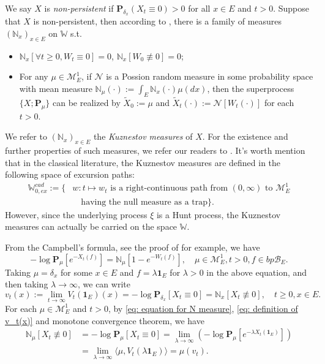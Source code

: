\documentclass[12pt, a4paper]{amsart}
\theoremstyle{definition}
\numberwithin{equation}{section}
\begin{document}
	We say $X$ is \emph{non-persistent} if $\mathbf P_{\delta_x}(X_t \equiv 0) > 0$ for all $x\in E$ and $t> 0$.
	Suppose that $X$ is non-persistent, then according to \cite[Section 8]{Li2011Measure-valued}, there is a family of measures $(\mathbb N_x)_{x\in E}$ on $\mathbb W$ s.t. 
\begin{itemize}
	\item 
	$\mathbb N_x [ \forall t \geq 0, W_t \equiv 0] =0$, $\mathbb N_x[W_0 \not\equiv 0] = 0$;
	\item
	For any $\mu \in \mathcal M_E^1$, if $\mathcal N$ is a Possion random measure in some probability space with mean measure $\mathbb N_\mu(\cdot):= \int_E \mathbb N_x(\cdot )\mu(dx)$, 
	then the superprocess $\{X;\mathbf P_\mu\}$ can be realized by $\tilde X_0 := \mu$ and $\tilde X_t(\cdot) := \mathcal N[W_t(\cdot)]$ for each $t>0$.
\end{itemize}
	We refer to $(\mathbb N_x)_{x\in E}$ the \emph{Kuznestov measures} of $X$.
	For the existence and further properties of such measures, we refer our readers to \cite{Li2011Measure-valued}.
	It's worth mention that in the classical literature, the Kuznestov measures are defined in the following space of excursion paths:
	\[\begin{split}
	\mathbb W^{cad}_{0,ex}:=\{ &w: t \mapsto w_t \text{ is a right-continuous path from $(0,\infty)$ to $\mathcal M_E^1$}
		\\&\quad \text {having the null measure as a trap}\}.
	\end{split} \]
	However, since the underlying process $\xi$ is a Hunt process, the Kuznestov measures can actually be carried on the space $\mathbb W$.
	
	From the Campbell's formula, see  the proof of \cite[Theorem 2.7]{Kyprianou2014Fluctuations} for example, we have
\[ \label{eq: equation for N measure}
	- \log \mathbf P_\mu [e^{-X_t(f)}] 
	= \mathbb N_\mu[ 1-e^{- W_t(f)}], 
	\quad \mu \in \mathcal M_E^1, t>0, f\in bp\mathscr B_E.
\]
	Taking $\mu = \delta_x$ for some $x\in E$ and $f = \lambda \mathbf 1_E$ for $\lambda > 0$ in the above equation, and then taking $\lambda \to \infty$, we can write
\[ \label{eq: definition of v_t(x)}
	v_t(x)
	:= \lim_{t\to \infty} V_t(\mathbf 1_E)(x)
	= -\log \mathbf P_{\delta_x} [X_t \equiv 0] 
	= \mathbb N_x[X_t\not \equiv 0],
	\quad t\geq 0, x\in E.
\]
	For each $\mu \in \mathcal M_E^1$ and $t > 0$, by \eqref{eq: equation for N measure}, \eqref{eq: definition of v_t(x)} and monotone convergence theorem, we have
\[ \label{eq: equation for mu v-t}\begin{split}
	\mathbb N_\mu[X_t\not \equiv 0]
	&= -\log \mathbf P_{\mu} [X_t \equiv 0] 
	= \lim_{\lambda \to \infty} (- \log \mathbf P_\mu [e^{-\lambda X_t(\mathbf 1_E)}])
	\\&= \lim_{\lambda \to \infty} \langle \mu, V_t(\lambda \mathbf 1_E)\rangle
	= \mu(v_t).
\end{split}\]
\end{document}
